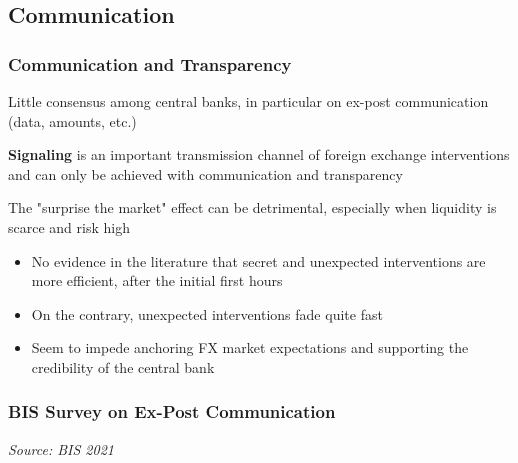 \documentclass{beamer}
\newenvironment{wideitemize}{\itemize\addtolength{\itemsep}{10pt}}{\enditemize}
\begin{document}
\subsection{Communication}
\begin{frame}
  \frametitle{Communication and Transparency}
  \begin{wideitemize}
  \item Little consensus among central banks, in particular on ex-post communication (data, amounts, etc.)
  \item \textbf{Signaling} is an important transmission channel of foreign exchange interventions and can only be achieved with communication and transparency
  \item The "surprise the market" effect can be detrimental, especially when liquidity is scarce and risk high
    \begin{itemize}
    \item No evidence in the literature that secret and unexpected interventions are more efficient, after the initial first hours
    \item On the contrary, unexpected interventions fade quite fast
    \item Seem to impede anchoring FX market expectations and supporting the credibility of the central bank
    \end{itemize}    
  \end{wideitemize}
\end{frame}



\begin{frame}
  \frametitle{BIS Survey on Ex-Post Communication}
  \medskip
  \emph{Source: BIS 2021 \href{https://www.bis.org/publ/mc_insights_fxinterventions.pdf}{}}
\end{frame}
\end{document}
